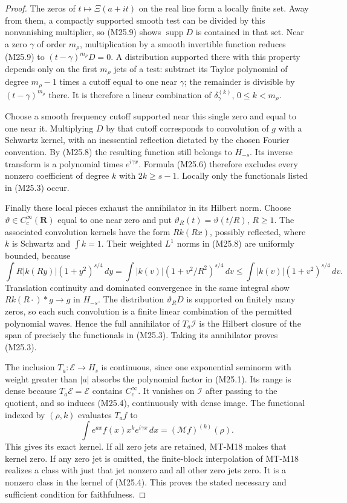 \documentclass[11pt,a4paper]{article}
\begin{document}
\begin{proof}
The zeros of $t\mapsto\Xi(a+it)$ on the real line form a
locally finite set. Away from them, a compactly supported
smooth test can be divided by this nonvanishing multiplier,
so (M25.9) shows $\operatorname{supp}D$ is contained in that
set. Near a zero $\gamma$ of order $m_\rho$, multiplication
by a smooth invertible function reduces (M25.9) to
$(t-\gamma)^{m_\rho}D=0$. A distribution supported there
with this property depends only on the first $m_\rho$ jets
of a test: subtract its Taylor polynomial of degree
$m_\rho-1$ times a cutoff equal to one near $\gamma$;
the remainder is divisible by $(t-\gamma)^{m_\rho}$ there.
It is therefore a linear combination of
$\delta_\gamma^{(k)}$, $0\le k<m_\rho$.

Choose a smooth frequency cutoff supported near this single
zero and equal to one near it. Multiplying $D$ by that
cutoff corresponds to convolution of $g$ with a Schwartz
kernel, with an inessential reflection dictated by the
chosen Fourier convention. By (M25.8) the resulting
function still belongs to $H_{-s}$. Its inverse transform
is a polynomial times $e^{i\gamma x}$. Formula (M25.6)
therefore excludes every nonzero coefficient of degree
$k$ with $2k\ge s-1$. Locally only the functionals listed
in (M25.3) occur.

Finally these local pieces exhaust the annihilator in its
Hilbert norm. Choose $\vartheta\in C_c^\infty(\mathbf R)$
equal to one near zero and put
$\vartheta_R(t)=\vartheta(t/R)$, $R\ge1$.
The associated convolution kernels have the form
$Rk(Rx)$, possibly reflected, where $k$ is Schwartz and
$\int k=1$. Their weighted $L^1$ norms in (M25.8) are
uniformly bounded, because
\[
 \int R|k(Ry)|(1+y^2)^{s/4}\,dy
       =\int|k(v)|(1+v^2/R^2)^{s/4}\,dv
       \le\int|k(v)|(1+v^2)^{s/4}\,dv.
\]
Translation continuity and dominated convergence in the
same integral show $Rk(R\cdot)*g\to g$ in $H_{-s}$.
The distribution $\vartheta_RD$ is supported on finitely
many zeros, so each such convolution is a finite linear
combination of the permitted polynomial waves. Hence
the full annihilator of $T_a\mathcal I$ is the Hilbert
closure of the span of precisely the functionals in
(M25.3). Taking its annihilator proves (M25.3).

The inclusion $T_a:\mathcal E\to H_s$ is continuous,
since one exponential seminorm with weight greater than
$|a|$ absorbs the polynomial factor in (M25.1). Its range
is dense because $T_a\mathcal E=\mathcal E$ contains
$C_c^\infty$. It vanishes on $\mathcal I$ after passing
to the quotient, and so induces (M25.4), continuously
with dense image. The functional indexed by $(\rho,k)$
evaluates $T_af$ to
\[
       \int e^{ax}f(x)x^ke^{i\gamma x}\,dx
                    =(\mathcal Mf)^{(k)}(\rho).
\]
This gives its exact kernel. If all zero jets are retained,
MT-M18 makes that kernel zero. If any zero jet is omitted,
the finite-block interpolation of MT-M18 realizes a class
with just that jet nonzero and all other zero jets zero.
It is a nonzero class in the kernel of (M25.4). This proves
the stated necessary and sufficient condition for faithfulness.
\end{proof}
\end{document}
